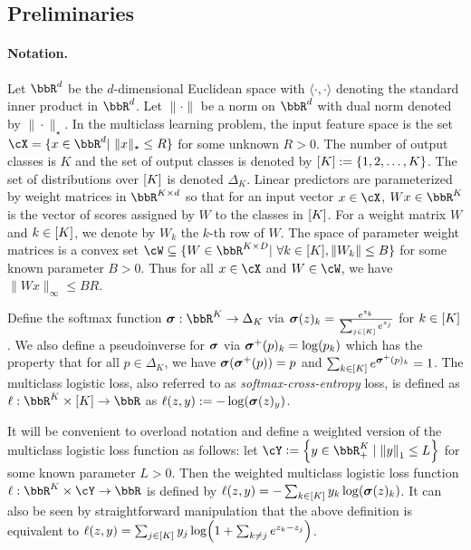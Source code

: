 \subsection{Preliminaries}
\label{sec:prelims}

\paragraph{Notation.} Let $\R^d$ be the $d$-dimensional Euclidean space with $\langle \cdot, \cdot \rangle$ denoting the standard inner product in $\R^d$. Let $\|\cdot\|$ be a norm on $\R^d$ with dual norm denoted by $\|\cdot\|_\star$. In the multiclass learning problem, the input feature space is the set $\cX = \{x \in \R^d|\ \|x\|_\star \leq R\}$ for some unknown $R>0$. The number of output classes is $K$ and the set of output classes is denoted by $[K] := \{1, 2, \ldots, K\}$. The set of distributions over $[K]$ is denoted $\Delta_K$. Linear predictors are parameterized by weight matrices in $\R^{K \times d}$ so that for an input vector $x \in \cX$, $Wx \in \R^K$ is the vector of scores assigned by $W$ to the classes in $[K]$. For a weight matrix $W$ and $k \in [K]$, we denote by $W_k$ the $k$-th row of $W$. The space of parameter weight matrices is a convex set $\cW \subseteq \{W \in \R^{K \times D}|\ \forall k \in \brk{K}, \|W_k\| \leq B\}$ for some known parameter $B > 0$. Thus for all $x \in \cX$ and $W \in \cW$, we have $\|Wx\|_\infty \leq BR$.

 Define the softmax function $\mb{\sigma}:\bbR^{K}\to\Delta_{K}$ via $\boldsymbol{\sigma}(z)_{k} = \frac{e^{z_k}}{\sum_{j\in[K]}e^{z_j}}$ for $k \in [K]$. We also define a pseudoinverse for $\boldsymbol{\sigma}$ via $\boldsymbol{\sigma}^{+}(p)_{k}=\log(p_k)$ which has the property that for all $p \in \Delta_{K}$, we have $\boldsymbol{\sigma}(\boldsymbol{\sigma}^{+}(p)) = p$ and $\sum_{k \in [K]}e^{\boldsymbol{\sigma}^{+}(p)_k} = 1$. The multiclass logistic loss, also referred to as \emph{softmax-cross-entropy} loss, is defined as $\ls: \bbR^{K}\times{}\brk{K}\to\bbR$ as $\ell(z, y) := -\log(\boldsymbol{\sigma}(z)_{y})$. 

 It will be convenient to overload notation and define a weighted version of the multiclass logistic loss function as follows: let $\cY\ldef\crl*{y\in\bbR^{K}_{+}\mid{} \nrm*{y}_{1}\leq{}L}$ for some known parameter $L > 0$. Then the weighted multiclass logistic loss function $\ls:\bbR^{K}\times{}\cY\to\bbR$ is defined by $\ell(z, y) = -\sum_{k\in[K]}y_{k}\log(\boldsymbol{\sigma}(z)_{k})$. It can also be seen by straightforward manipulation that the above definition is equivalent to $\ls(z, y) = \sum_{j\in\brk{K}}y_j\log\prn*{1 + \sum_{k\neq{}j}e^{z_k-z_j}}$.
 
